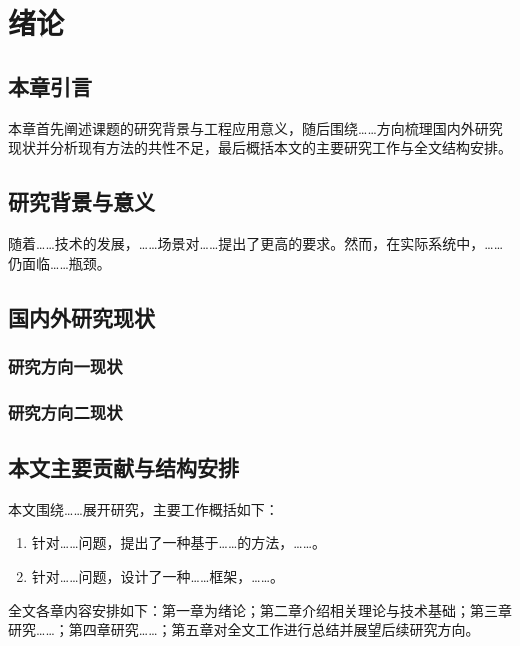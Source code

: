 \chapter{绪论}

\section{本章引言}
本章首先阐述课题的研究背景与工程应用意义，随后围绕……方向梳理国内外研究现状并分析现有方法的共性不足，最后概括本文的主要研究工作与全文结构安排。

\section{研究背景与意义}
随着……技术的发展，……场景对……提出了更高的要求。然而，在实际系统中，……仍面临……瓶颈\cite{example2024uestc}。

\section{国内外研究现状}
\subsection{研究方向一现状}

\subsection{研究方向二现状}

\section{本文主要贡献与结构安排}
本文围绕……展开研究，主要工作概括如下：
\begin{enumerate}
  \item 针对……问题，提出了一种基于……的方法，……。
  \item 针对……问题，设计了一种……框架，……。
\end{enumerate}

全文各章内容安排如下：第一章为绪论；第二章介绍相关理论与技术基础；第三章研究……；第四章研究……；第五章对全文工作进行总结并展望后续研究方向。
